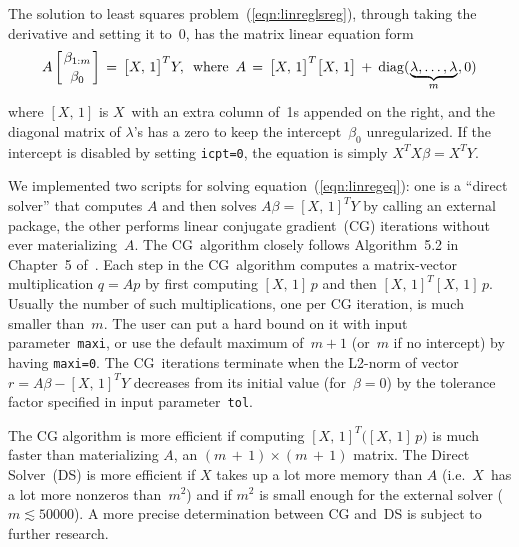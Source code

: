 The solution to least squares problem~(\ref{eqn:linreglsreg}), through taking the derivative
and setting it to~0, has the matrix linear equation form
\begin{equation}
A\left[\textstyle\beta_{1:m}\atop\textstyle\beta_0\right] \,=\, \big[X,\,1\big]^T Y,\,\,\,
\textrm{where}\,\,\,
A \,=\, \big[X,\,1\big]^T \big[X,\,1\big]\,+\,\hspace{0.5pt} \diag(\hspace{0.5pt}
\underbrace{\raisebox{0pt}[0pt][0.5pt]{$\lambda,\ldots, \lambda$}}_{\raisebox{2pt}{$\scriptstyle m$}}
\hspace{0.5pt}, 0)
\label{eqn:linregeq}
\end{equation}
where $[X,\,1]$ is $X$~with an extra column of~1s appended on the right, and the
diagonal matrix of $\lambda$'s has a zero to keep the intercept~$\beta_0$ unregularized.
If the intercept is disabled by setting {\tt icpt=0}, the equation is simply
\mbox{$X^T X \beta = X^T Y$}.

We implemented two scripts for solving equation~(\ref{eqn:linregeq}): one is a ``direct solver''
that computes $A$ and then solves $A\beta = [X,\,1]^T Y$ by calling an external package,
the other performs linear conjugate gradient~(CG) iterations without ever materializing~$A$.
The CG~algorithm closely follows Algorithm~5.2 in Chapter~5 of~\cite{Nocedal2006:Optimization}.
Each step in the CG~algorithm computes a matrix-vector multiplication $q = Ap$ by first computing
$[X,\,1]\, p$ and then $[X,\,1]^T [X,\,1]\, p$.  Usually the number of such multiplications,
one per CG iteration, is much smaller than~$m$.  The user can put a hard bound on it with input 
parameter~{\tt maxi}, or use the default maximum of~$m+1$ (or~$m$ if no intercept) by
having {\tt maxi=0}.  The CG~iterations terminate when the L2-norm of vector
$r = A\beta - [X,\,1]^T Y$ decreases from its initial value (for~$\beta=0$) by the tolerance
factor specified in input parameter~{\tt tol}.

The CG algorithm is more efficient if computing
$[X,\,1]^T \big([X,\,1]\, p\big)$ is much faster than materializing $A$,
an $(m\,{+}\,1)\times(m\,{+}\,1)$ matrix.  The Direct Solver~(DS) is more efficient if
$X$ takes up a lot more memory than $A$ (i.e.\ $X$~has a lot more nonzeros than~$m^2$)
and if $m^2$ is small enough for the external solver ($m \lesssim 50000$).  A more precise
determination between CG and~DS is subject to further research.

